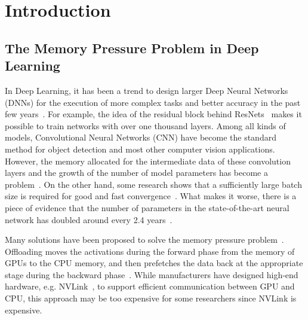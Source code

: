 \section{Introduction}\label{sec:introduction}

\subsection{The Memory Pressure Problem in Deep Learning}


In Deep Learning, it has been a trend to design larger Deep Neural Networks (DNNs) for the execution of more complex tasks and better accuracy in the past few years~\cite{He2015DeepRL, 10.5555/3298023.3298188, Wu2016GooglesNM, 2016arXiv160507146Z, Zoph2017LearningTA, Simonyan2014VeryDC}. For example, the idea of the residual block behind ResNets~\cite{He2015DeepRL} makes it possible to train networks with over one thousand layers.
Among all kinds of models, Convolutional Neural Networks (CNN) have become the standard method for object detection and most other computer vision applications.
However, the memory allocated for the intermediate data of these convolution layers and the growth of the number of model parameters has become a problem~\cite{Wu2016HighperformanceSS, 8237506, Yu2022CoCaCC, Tan2019EfficientNetRM, Hu2017SqueezeandExcitationN}.
On the other hand, some research shows that a sufficiently large batch size is required for good and fast convergence~\cite{Pudipeddi2020TrainingLN}.
What makes it worse, there is a piece of evidence that the number of parameters in the state-of-the-art neural network has doubled around every 2.4 years~\cite{Goodfellow-et-al-2016}.


Many solutions have been proposed to solve the memory pressure problem~\cite{Huang2020SwapAdvisorPD, Rhu2016vDNNVD, Le2018TFLMSLM, Han2015DeepCC, Han2015LearningBW, Gupta2015DeepLW, 10.1145/2925426.2926294}.
Offloading moves the activations during the forward phase from the memory of GPUs to the CPU memory,  and then prefetches the data back at the appropriate stage during the backward phase~\cite{Rhu2016vDNNVD}.
While manufacturers have designed high-end hardware, e.g. NVLink~\cite{Le2018TFLMSLM}, to support efficient communication between GPU and CPU, this approach may be too expensive for some researchers since NVLink is expensive.

